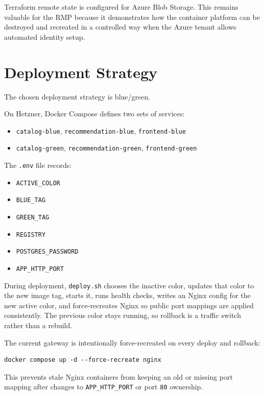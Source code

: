 \documentclass[11pt,a4paper]{article}
\begin{document}
Terraform remote state is configured for Azure Blob Storage. This remains valuable for the RMP because it demonstrates how the container platform can be destroyed and recreated in a controlled way when the Azure tenant allows automated identity setup.

\section{Deployment Strategy}

The chosen deployment strategy is blue/green.

On Hetzner, Docker Compose defines two sets of services:

\begin{itemize}
\item \texttt{catalog-blue}, \texttt{recommendation-blue}, \texttt{frontend-blue}
\item \texttt{catalog-green}, \texttt{recommendation-green}, \texttt{frontend-green}
\end{itemize}

The \texttt{.env} file records:

\begin{itemize}
\item \texttt{ACTIVE\_COLOR}
\item \texttt{BLUE\_TAG}
\item \texttt{GREEN\_TAG}
\item \texttt{REGISTRY}
\item \texttt{POSTGRES\_PASSWORD}
\item \texttt{APP\_HTTP\_PORT}
\end{itemize}

During deployment, \texttt{deploy.sh} chooses the inactive color, updates that color to the new image tag, starts it, runs health checks, writes an Nginx config for the new active color, and force-recreates Nginx so public port mappings are applied consistently. The previous color stays running, so rollback is a traffic switch rather than a rebuild.

The current gateway is intentionally force-recreated on every deploy and rollback:

\begin{lstlisting}
docker compose up -d --force-recreate nginx
\end{lstlisting}

This prevents stale Nginx containers from keeping an old or missing port mapping after changes to \texttt{APP\_HTTP\_PORT} or port \texttt{80} ownership.
\end{document}
